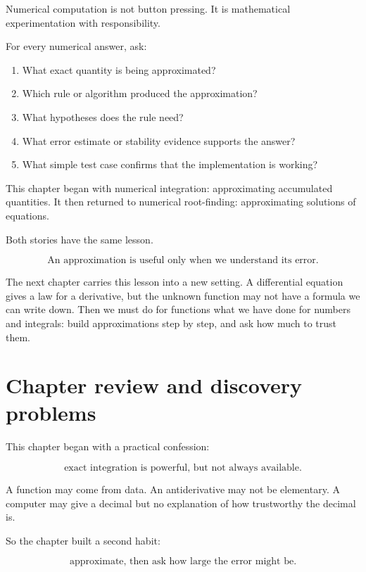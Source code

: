 Numerical computation is not button pressing.  It is mathematical experimentation
with responsibility.

For every numerical answer, ask:

\begin{enumerate}
\item What exact quantity is being approximated?

\item Which rule or algorithm produced the approximation?

\item What hypotheses does the rule need?

\item What error estimate or stability evidence supports the answer?

\item What simple test case confirms that the implementation is working?
\end{enumerate}

This chapter began with numerical integration: approximating accumulated quantities.
It then returned to numerical root-finding: approximating solutions of equations.

Both stories have the same lesson.

\[
\boxed{
\text{An approximation is useful only when we understand its error.}
}
\]

The next chapter carries this lesson into a new setting.  A differential equation gives a
law for a derivative, but the unknown function may not have a formula we can write
down.  Then we must do for functions what we have done for numbers and integrals:
build approximations step by step, and ask how much to trust them.
\section{Chapter review and discovery problems}
\label{sec:chapter-12-review-discovery}

This chapter began with a practical confession:

\[
\text{exact integration is powerful, but not always available.}
\]

A function may come from data.  An antiderivative may not be elementary.  A computer
may give a decimal but no explanation of how trustworthy the decimal is.

So the chapter built a second habit:

\[
\boxed{
\text{approximate, then ask how large the error might be.}
}
\]

